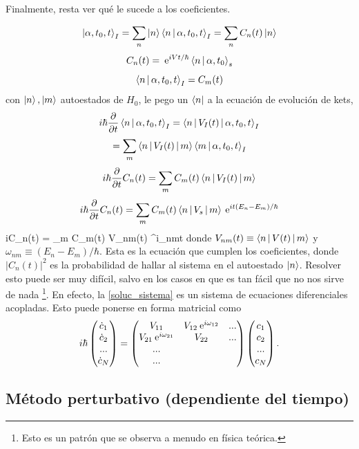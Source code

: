 \documentclass[10pt,oneside]{CBFT_book}
\begin{document}
Finalmente, resta ver qué le sucede a los coeficientes.

\[
	\Ket{\alpha,t_0,t}_I = \sum_n \Ket{n}\Braket{n|\alpha,t_0,t}_I = \sum_n C_n(t) \Ket{n}
\]
\[
	C_n(t) = \:\mathrm{e}^{iVt/\hbar} \Braket{n|\alpha,t_0}_s
\]
\[
	\Braket{n|\alpha,t_0,t}_I = C_m(t)
\]
con $\Ket{n},\ket{m}$ autoestados de $H_0$, le pego un $\Bra{n}$ a la ecuación de evolución de kets,
\[
	i\hbar \frac{\partial^{\hspace{-0.05em}} {}}{\partial {t}^{\hspace{-0.05em}}} \Braket{n|\alpha,t_0,t}_I = \Braket{n|V_I(t)|\alpha,t_0,t}_I
\]
\[
	= \sum_m \Braket{n|V_I(t)|m}\Braket{m|\alpha,t_0,t}_I
\]
\[
	i\hbar \frac{\partial^{\hspace{-0.05em}} {}}{\partial {t}^{\hspace{-0.05em}}}C_n(t) = \sum_m C_m(t) \Braket{n|V_I(t)|m}
\]
\[
	i\hbar \frac{\partial^{\hspace{-0.05em}} {}}{\partial {t}^{\hspace{-0.05em}}}C_n(t) = \sum_m C_m(t) \Braket{n|V_s|m} \:\mathrm{e}^{it(E_n-E_m)/\hbar}
\]
\be
	i\hbar {}C_n(t) = \sum_m C_m(t) V_{nm}(t) \euler^{i\omega_{nm}t}
	\label{solu_sistema}
\ee
donde $V_{nm}(t) \equiv \Braket{n|V(t)|m}$ y $\omega_{nm} \equiv (E_n-E_m)/\hbar$.
Esta es la ecuación que cumplen los coeficientes, donde $|C_n(t)|^2$ es la probabilidad de hallar al sistema 
en el autoestado $\Ket{n}$.
Resolver esto puede ser muy difícil, salvo en los casos en que es tan fácil que no nos
sirve de nada \footnote{Esto es un patrón que se observa a menudo en física teórica.}.
En efecto, la \eqref{soluc_sistema} es un sistema de ecuaciones diferenciales acopladas.
Esto puede ponerse en forma matricial como
\[
	i\hbar \begin{pmatrix}
	\dot{c}_1 \\ \dot{c}_2 \\ ... \\ \dot{c}_N \\
	\end{pmatrix} 
	=
	\begin{pmatrix}
	V_{11} & V_{12}\:\mathrm{e}^{i\omega_{12}} & ... \\ 
	V_{21}\:\mathrm{e}^{i\omega_{21}} & V_{22} & ... \\ 
	... \\ 
	... \\
	\end{pmatrix}
	\begin{pmatrix}
	c_1 \\ c_2 \\ ... \\ c_N \\
	\end{pmatrix} .
\]


\subsection{Método perturbativo (dependiente del tiempo)}
\end{document}
